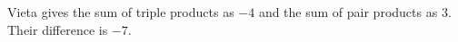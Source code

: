 Vieta gives the sum of triple products as $-4$ and the sum of pair products as $3$. Their difference is $\boxed{-7}$.
